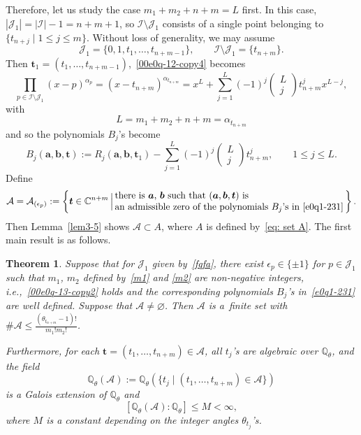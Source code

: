 \documentclass[pdftex]{sigma}
\numberwithin{equation}{section}
\newtheorem{Theorem}{Theorem}[section]
\def\C{\mathbb C}
\def\Q{\mathbb Q}
\begin{document}
Therefore, let us study the case $m_1+m_2+n+m=L$ first. In this case,
$|\mathcal{J}_1|= |\mathcal{I}|-1=n+m+1$, so
$\mathcal{I}\setminus\mathcal{J}_1$ consists of a single point
belonging to $\{t_{n+j}\mid 1\leq j\leq m\}$. Without loss of
generality, we may assume
\begin{equation}\label{fqfa}
 \mathcal{J}_1=\{0,1,t_1,\dots, t_{n+m-1}\},\qquad
 \mathcal{I}\setminus\mathcal{J}_1=\{t_{n+m}\}.
\end{equation}
Then $\boldsymbol t_1=(t_1,\dots, t_{n+m-1})$,~\eqref{00e0q-12-copy4} becomes
\begin{equation*}%
\prod_{p\in \mathcal{I}\setminus\mathcal{J}_1} (x-p)^{\alpha_{p}}=(x-t_{n+m})^{{\alpha}_{t_{n+m}}}=x^{L}
+\sum_{j=1}^{L}(-1)^j
\begin{pmatrix}L\\ j\end{pmatrix}t_{n+m}^jx^{L-j},
\end{equation*}
with
\begin{equation}\label{00e0q-13-copy2}L=m_1+m_2+n+m={\alpha}_{t_{n+m}}\end{equation} and so the polynomials $B_j$'s become
\begin{equation}
\label{e0q1-231}
B_j(\boldsymbol a,\boldsymbol b,\boldsymbol t):=R_j(\boldsymbol a,\boldsymbol b,\boldsymbol t_1)-\sum_{j=1}^{L}(-1)^j
\begin{pmatrix}L\\ j\end{pmatrix}t_{n+m}^j,\qquad 1\leq j\leq L.
\end{equation}
Define
\[\mathcal{A}=\mathcal{A}_{(\epsilon_p)}:=\left\{\boldsymbol {t}\in\C^{n+m}\,\Big|\,\begin{array}{@{}lll@{}}\text{there is $\boldsymbol a$, $\boldsymbol b$ such that $(\boldsymbol a,\boldsymbol b,\boldsymbol t)$ is}\\ \text{an admissible zero of the polynomials $B_j$'s in~\eqref{e0q1-231}}\end{array}\!\!\right\}.
\]
Then Lemma~\ref{lem3-5} shows $\mathcal{A}\subset A$, where $A$ is
defined by~\eqref{eq: set A}.
The first main result is as follows.

\begin{Theorem}\label{thm-J1}
Suppose that for $\mathcal{J}_1$ given by~\eqref{fqfa}, there exist
$\epsilon_p\in \{\pm 1\}$ for $p\in\mathcal{J}_1$ such that $m_1$, $m_2$
defined by~\eqref{m1} and \eqref{m2} are non-negative integers,
i.e.,~\eqref{00e0q-13-copy2} holds and the corresponding polynomials
$B_j$'s in~\eqref{e0q1-231} are well defined.
Suppose that $\mathcal{A}\neq \varnothing$. Then $\mathcal{A}$ is a~finite set with $\#\mathcal{A}\leq
\frac{(\theta_{t_{n+m}}-1)!}{m_1!m_2!}$.

Furthermore, for each $\boldsymbol t=(t_1,\dots,t_{n+m})\in
\mathcal{A}$, all $t_j$'s are algebraic over $\Q_{\theta}$, and the
field
\[
 \Q_\theta(\mathcal{A}):=\Q_{\theta}(\{t_j \mid (t_1,\dots,t_{n+m})\in
 \mathcal{A}\})
\]
is a Galois extension of $\Q_{\theta}$ and
\[[\Q_\theta(\mathcal{A}) :\Q_\theta]\leq M<\infty,\]
where $M$ is a constant depending on the integer angles
$\theta_{t_{j}}$'s.
\end{Theorem}
\end{document}
